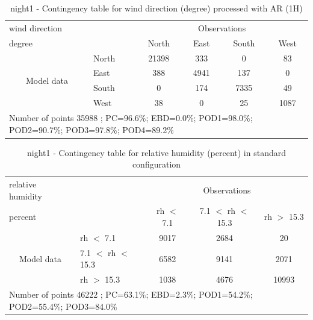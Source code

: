 \begin{table}[p!]
\begin{center}
\begin{tabular}{llcccc}
\hline
{wind direction}                                       &                                                    & \multicolumn{4}{c}{Observations}                 \\
{degree}                                       &                             & {North}   & {East} & {South} & {West} \\
\hline
\multicolumn{1}{c}{\multirow{4}{*}{Model data}}  & {North}              & 21398                & 333                       & 0              & 83\\
                                                 & {East}               & 388                & 4941                       & 137              & 0\\
                                                 & {South}              & 0                & 174                      & 7335             & 49\\
                                                 & {West}               & 38               & 0                      & 25             & 1087\\
\hline 
\multicolumn{6}{l}{ Number of points        35988 ; PC=96.6\%; EBD=0.0\%; POD1=98.0\%; POD2=90.7\%; POD3=97.8\%; POD4=89.2\%}                 \\
\end{tabular}
\end{center}
\caption{night1 - Contingency table for {wind direction} (degree) processed with AR (1H)}
\label{tab:contingencywdAFT:night1}
\end{table}
\begin{table}[p!]
\begin{center}
\begin{tabular}{llccc}
\hline
{relative humidity}                                       &                                                    & \multicolumn{3}{c}{Observations}                 \\
{percent}                                       &                             & rh $<$ 7.1   & 7.1 $<$ rh $<$ 15.3 & rh $>$ 15.3 \\
\hline
\multicolumn{1}{c}{\multirow{3}{*}{Model data}}  & rh $<$ 7.1             & 9017                & 2684                       & 20              \\
                                                 & 7.1  $<$ rh $<$ 15.3 & 6582                & 9141                       & 2071              \\
                                                 & rh $>$ 15.3             & 1038                & 4676                       & 10993              \\
\hline
\multicolumn{5}{l}{ Number of points        46222 ; PC=63.1\%; EBD=2.3\%; POD1=54.2\%; POD2=55.4\%; POD3=84.0\%}
\end{tabular}
\end{center}
\caption{night1 - Contingency table for  relative humidity (percent) in standard configuration}
\label{tab:contingencyrhBEF:night1}
\end{table}
